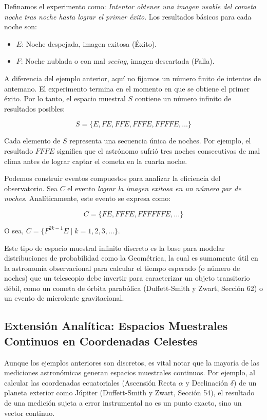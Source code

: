 Definamos el experimento como: \textit{Intentar obtener una imagen usable del cometa noche tras noche hasta lograr el primer éxito}. 
Los resultados básicos para cada noche son:
\begin{itemize}
    \item $E$: Noche despejada, imagen exitosa (Éxito).
    \item $F$: Noche nublada o con mal \textit{seeing}, imagen descartada (Falla).
\end{itemize}

A diferencia del ejemplo anterior, aquí no fijamos un número finito de intentos de antemano. El experimento termina en el momento en que se obtiene el primer éxito. Por lo tanto, el espacio muestral $S$ contiene un número infinito de resultados posibles:

$$ S = \{E, FE, FFE, FFFE, FFFFE, \dots\} $$

Cada elemento de $S$ representa una secuencia única de noches. Por ejemplo, el resultado $FFFE$ significa que el astrónomo sufrió tres noches consecutivas de mal clima antes de lograr captar el cometa en la cuarta noche. 

Podemos construir eventos compuestos para analizar la eficiencia del observatorio. Sea $C$ el evento \textit{lograr la imagen exitosa en un número par de noches}. Analíticamente, este evento se expresa como:

$$ C = \{FE, FFFE, FFFFFFE, \dots\} $$

O sea, $C = \{F^{2k-1}E \mid k = 1, 2, 3, \dots\}$. 

Este tipo de espacio muestral infinito discreto es la base para modelar distribuciones de probabilidad como la Geométrica, la cual es sumamente útil en la astronomía observacional para calcular el tiempo esperado (o número de noches) que un telescopio debe invertir para caracterizar un objeto transitorio débil, como un cometa de órbita parabólica (Duffett-Smith y Zwart, Sección 62) o un evento de microlente gravitacional.

\subsection{Extensión Analítica: Espacios Muestrales Continuos en Coordenadas Celestes}

Aunque los ejemplos anteriores son discretos, es vital notar que la mayoría de las mediciones astronómicas generan espacios muestrales continuos. Por ejemplo, al calcular las coordenadas ecuatoriales (Ascensión Recta $\alpha$ y Declinación $\delta$) de un planeta exterior como Júpiter (Duffett-Smith y Zwart, Sección 54), el resultado de una medición sujeta a error instrumental no es un punto exacto, sino un vector continuo. 

